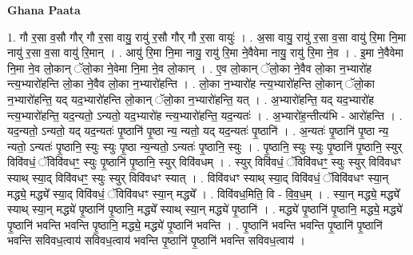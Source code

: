 \documentclass[17pt]{extarticle}
\begin{document}
\textbf{Ghana Paata } \newline

1. गौ र॒सा व॒सौ गौर् गौ र॒सा वायु॒ रायु॑ र॒सौ गौर् गौ र॒सा वायुः॑ । . अ॒सा वायु॒ रायु॑ र॒सा व॒सा वायु॑ रि॒मा नि॒मा नायु॑ र॒सा व॒सा वायु॑ रि॒मान् । . आयु॑ रि॒मा नि॒मा नायु॒ रायु॑ रि॒मा ने॒वैवेमा नायु॒ रायु॑ रि॒मा ने॒व । . इ॒मा ने॒वैवेमा नि॒मा ने॒व लो॒कान् ॅलो॒का ने॒वेमा नि॒मा ने॒व लो॒कान् । . ए॒व लो॒कान् ॅलो॒का ने॒वैव लो॒का न॒भ्यारो॑ह न्त्य॒भ्यारो॑हन्ति लो॒का ने॒वैव लो॒का न॒भ्यारो॑हन्ति । . लो॒का न॒भ्यारो॑ह न्त्य॒भ्यारो॑हन्ति लो॒कान् ॅलो॒का न॒भ्यारो॑हन्ति॒ यद् यद॒भ्यारो॑हन्ति लो॒कान् ॅलो॒का न॒भ्यारो॑हन्ति॒ यत् । . अ॒भ्यारो॑हन्ति॒ यद् यद॒भ्यारो॑ह न्त्य॒भ्यारो॑हन्ति॒ यद॒न्यतो॒ ऽन्यतो॒ यद॒भ्यारो॑ह न्त्य॒भ्यारो॑हन्ति॒ यद॒न्यतः॑ । . अ॒भ्यारो॑ह॒न्तीत्य॑भि - आरो॑हन्ति । . यद॒न्यतो॒ ऽन्यतो॒ यद् यद॒न्यतः॑ पृ॒ष्ठानि॑ पृ॒ष्ठा न्य॒ न्यतो॒ यद् यद॒न्यतः॑ पृ॒ष्ठानि॑ । . अ॒न्यतः॑ पृ॒ष्ठानि॑ पृ॒ष्ठा न्य॒ न्यतो॒ ऽन्यतः॑ पृ॒ष्ठानि॒ स्युः स्युः पृ॒ष्ठा न्य॒न्यतो॒ ऽन्यतः॑ पृ॒ष्ठानि॒ स्युः । . पृ॒ष्ठानि॒ स्युः स्युः पृ॒ष्ठानि॑ पृ॒ष्ठानि॒ स्युर् विवि॑वधं॒ ॅविवि॑वधꣳ॒॒ स्युः पृ॒ष्ठानि॑ पृ॒ष्ठानि॒ स्युर् विवि॑वधम् । . स्युर् विवि॑वधं॒ ॅविवि॑वधꣳ॒॒ स्युः स्युर् विवि॑वधꣳ स्याथ् स्या॒द् विवि॑वधꣳ॒॒ स्युः स्युर् विवि॑वधꣳ स्यात् । . विवि॑वधꣳ स्याथ् स्या॒द् विवि॑वधं॒ ॅविवि॑वधꣳ स्या॒न् मद्ध्ये॒ मद्ध्ये᳚ स्या॒द् विवि॑वधं॒ ॅविवि॑वधꣳ स्या॒न् मद्ध्ये᳚ । . विवि॑वध॒मिति॒ वि - वि॒व॒ध॒म् । . स्या॒न् मद्ध्ये॒ मद्ध्ये᳚ स्याथ् स्या॒न् मद्ध्ये॑ पृ॒ष्ठानि॑ पृ॒ष्ठानि॒ मद्ध्ये᳚ स्याथ् स्या॒न् मद्ध्ये॑ पृ॒ष्ठानि॑ । . मद्ध्ये॑ पृ॒ष्ठानि॑ पृ॒ष्ठानि॒ मद्ध्ये॒ मद्ध्ये॑ पृ॒ष्ठानि॑ भवन्ति भवन्ति पृ॒ष्ठानि॒ मद्ध्ये॒ मद्ध्ये॑ पृ॒ष्ठानि॑ भवन्ति । . पृ॒ष्ठानि॑ भवन्ति भवन्ति पृ॒ष्ठानि॑ पृ॒ष्ठानि॑ भवन्ति सविवध॒त्वाय॑ सविवध॒त्वाय॑ भवन्ति पृ॒ष्ठानि॑ पृ॒ष्ठानि॑ भवन्ति सविवध॒त्वाय॑ । \newline
\end{document}
